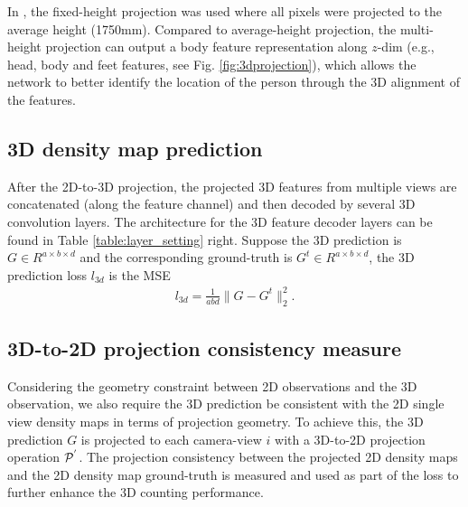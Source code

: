 \documentclass[letterpaper]{article}
\newcommand{\citealp}[1]{\citeauthor{#1} \citeyear{#1}}
\begin{document}
\par
In \citealp{zhang2019wide}, the fixed-height projection was used where all pixels were projected to the average height (1750mm). Compared to average-height projection, the multi-height projection can output a body feature representation along $z$-dim (e.g., head, body and feet features, see Fig. \ref{fig:3dprojection}), which allows the network to better identify the location of the person through the 3D alignment of the features.


\subsection{3D density map prediction}
After the 2D-to-3D projection, the projected 3D features from multiple views are concatenated (along the feature channel) and then decoded by several 3D convolution layers.
The architecture for the 3D feature decoder layers can be found in Table \ref{table:layer_setting} right.
Suppose the 3D prediction is $G \in {R^{a \times b \times d}} $ and the corresponding ground-truth is $G^t \in {R^{a \times b \times d}}$, the 3D prediction loss $l_{3d}$ is the MSE
\begin{align}
  l_{3d} = \frac{1}{abd} \parallel G - G^t \parallel _2^2.
\end{align}





\subsection{3D-to-2D projection consistency measure}
\par
Considering the geometry constraint between 2D observations and the 3D observation, we also require the 3D prediction be consistent with the 2D single view density maps in terms of projection geometry. To achieve this, the 3D prediction $G$ is projected to each camera-view $i$ with a 3D-to-2D projection operation ${\cal P}^{'}$. The projection consistency between the projected 2D density maps and the 2D density map ground-truth is measured and used as part of the loss to further enhance the 3D counting performance.
\end{document}
